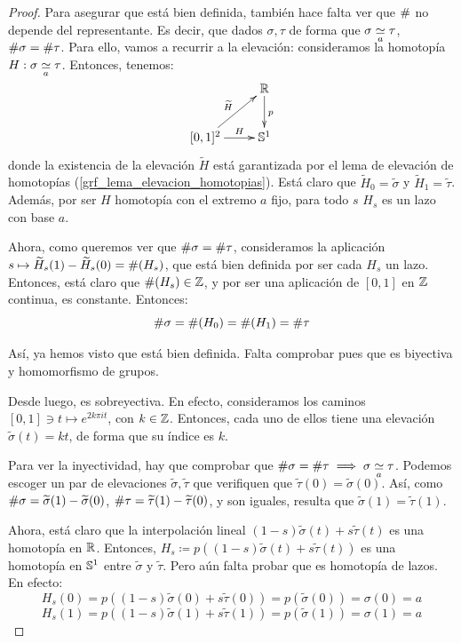 \begin{theo}
\begin{proof}
Para asegurar que está bien definida, también hace falta ver que $\indice$ no depende del representante. Es decir, que dados $\sigma,\tau$ de forma que $\sigma\homot[a]\tau$, $\indice\sigma = \indice\tau$. Para ello, vamos a recurrir a la elevación: consideramos la homotopía $H:\sigma\homot[a]\tau$. Entonces, tenemos:
\[\xymatrix{
& \R \ar[d]^p \\
[0,1]^2 \ar[ru]^{\widetilde{H}} \ar[r]^-H & \Sfe^1
}\]
donde la existencia de la elevación $\widetilde{H}$ está garantizada por el lema de elevación de homotopías (\ref{grf_lema_elevacion_homotopias}). Está claro que $\widetilde{H}_0 = \widetilde{\sigma}$ y $\widetilde{H}_1 = \widetilde{\tau}$. Además, por ser $H$ homotopía con el extremo $a$ fijo, para todo $s$ $H_s$ es un lazo con base $a$.

Ahora, como queremos ver que $\indice\sigma = \indice\tau$, consideramos la aplicación $s\mapsto \widetilde{H}_s(1)-\widetilde{H}_s(0)=\indice(H_s)$, que está bien definida por ser cada $H_s$ un lazo. Entonces, está claro que $\indice(H_s)\in\Z$, y por ser una aplicación de $[0,1]$ en $\Z$ continua, es constante. Entonces:
\[\indice\sigma = \indice(H_0) = \indice(H_1) = \indice\tau\]

Así, ya hemos visto que está bien definida. Falta comprobar pues que es biyectiva y homomorfismo de grupos.

Desde luego, es sobreyectiva. En efecto, consideramos los caminos $[0,1]\ni t\mapsto e^{2k\pi it}$, con $k\in\Z$.  Entonces, cada uno de ellos tiene una elevación $\widetilde{\sigma}(t)=kt$, de forma que su índice es $k$.

Para ver la inyectividad, hay que comprobar que $\indice\sigma = \indice\tau\implies \sigma\homot[a]\tau$. Podemos escoger un par de elevaciones $\widetilde{\sigma},\widetilde{\tau}$ que verifiquen que $\widetilde{\tau}(0)=\widetilde{\sigma}(0)$. Así, como $\indice\sigma = \widetilde{\sigma}(1)-\widetilde{\sigma}(0)$, $\indice\tau = \widetilde{\tau}(1)-\widetilde{\tau}(0)$, y son iguales, resulta que $\widetilde{\sigma}(1)=\widetilde{\tau}(1)$.

Ahora, está claro que la interpolación lineal $(1-s)\widetilde{\sigma}(t) + s\widetilde{\tau}(t)$ es una homotopía en $\R$. Entonces, $H_s \coloneqq p((1-s)\widetilde{\sigma}(t) + s\widetilde{\tau}(t))$ es una homotopía en $\Sfe^1$ entre $\widetilde{\sigma}$ y $\widetilde{\tau}$. Pero aún falta probar que es homotopía de lazos. En efecto:
\[H_s(0)= p((1-s)\widetilde{\sigma}(0) + s\widetilde{\tau}(0))=p(\widetilde{\sigma}(0))=\sigma(0)=a\]
\[H_s(1)= p((1-s)\widetilde{\sigma}(1) + s\widetilde{\tau}(1))=p(\widetilde{\sigma}(1))=\sigma(1)=a\]


\end{proof}
\end{theo}
